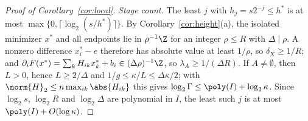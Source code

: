 \begin{proof}[Proof of Corollary~\ref{cor:local}]
\emph{Stage count.} The least $j$ with $h_j=s2^{-j}\le h^*$ is at most
$\max\{0,\lceil\log_2(s/h^*)\rceil\}$. By Corollary~\ref{cor:height}(a), the
isolated minimizer $x^*$ and all endpoints lie in $\rho^{-1}\Z$ for an integer
$\rho\le R$ with $\Delta\mid\rho$. A nonzero difference $x^*_i-e$ therefore has
absolute value at least $1/\rho$, so $\delta_X\ge1/R$; and
$\partial_iF(x^*)=\sum_kH_{ik}x^*_k+b_i\in(\Delta\rho)^{-1}\Z$, so
$\lambda_A\ge1/(\Delta R)$. If $A\ne\emptyset$, then $L>0$, hence
$L\ge2/\Delta$ and $1/g\le\kappa/L\le\Delta\kappa/2$; with
$\norm{H}_2\le n\max_{ik}\abs{H_{ik}}$ this gives
$\log_2\Gamma\le\poly(I)+\log_2\kappa$. Since $\log_2s$, $\log_2R$ and
$\log_2\Delta$ are polynomial in $I$, the least such $j$ is at most
$\poly(I)+O(\log\kappa)$.
\end{proof}

